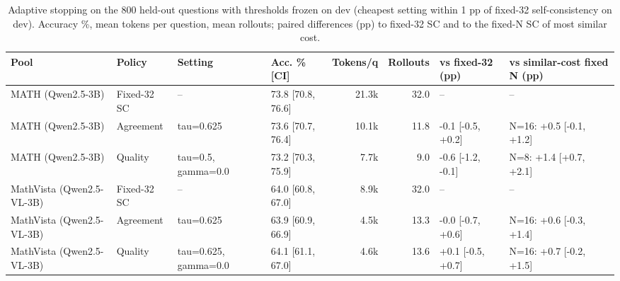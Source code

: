 \begin{table}[t]
\centering
\small
\caption{Adaptive stopping on the 800 held-out questions with thresholds frozen on dev (cheapest setting within 1 pp of fixed-32 self-consistency on dev). Accuracy \%, mean tokens per question, mean rollouts; paired differences (pp) to fixed-32 SC and to the fixed-N SC of most similar cost.}
\label{tab:T8_adaptive}
\begin{tabular}{llllrrll}
\toprule
Pool & Policy & Setting & Acc. \% [CI] & Tokens/q & Rollouts & vs fixed-32 (pp) & vs similar-cost fixed N (pp) \\
\midrule
MATH (Qwen2.5-3B) & Fixed-32 SC & -- & 73.8 [70.8, 76.6] & 21.3k & 32.0 & -- & -- \\
MATH (Qwen2.5-3B) & Agreement & tau=0.625 & 73.6 [70.7, 76.4] & 10.1k & 11.8 & -0.1 [-0.5, +0.2] & N=16: +0.5 [-0.1, +1.2] \\
MATH (Qwen2.5-3B) & Quality & tau=0.5, gamma=0.0 & 73.2 [70.3, 75.9] & 7.7k & 9.0 & -0.6 [-1.2, -0.1] & N=8: +1.4 [+0.7, +2.1] \\
MathVista (Qwen2.5-VL-3B) & Fixed-32 SC & -- & 64.0 [60.8, 67.0] & 8.9k & 32.0 & -- & -- \\
MathVista (Qwen2.5-VL-3B) & Agreement & tau=0.625 & 63.9 [60.9, 66.9] & 4.5k & 13.3 & -0.0 [-0.7, +0.6] & N=16: +0.6 [-0.3, +1.4] \\
MathVista (Qwen2.5-VL-3B) & Quality & tau=0.625, gamma=0.0 & 64.1 [61.1, 67.0] & 4.6k & 13.6 & +0.1 [-0.5, +0.7] & N=16: +0.7 [-0.2, +1.5] \\
\bottomrule
\end{tabular}
\end{table}
